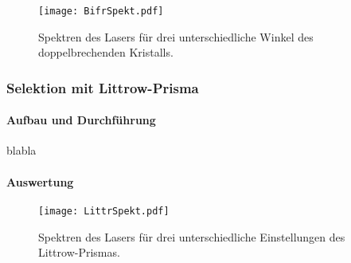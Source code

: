 \begin{figure}[H]
\begin{center}
  \texttt{[image: BifrSpekt.pdf]}
  \caption{Spektren des Lasers für drei unterschiedliche Winkel des doppelbrechenden Kristalls.}
  \label{img:BifrSpekt}
\end{center}
\end{figure}

\subsubsection{Selektion mit Littrow-Prisma}

\paragraph{Aufbau und Durchführung}
blabla


\paragraph{Auswertung}



\begin{figure}[H]
\begin{center}
  \texttt{[image: LittrSpekt.pdf]}
  \caption{Spektren des Lasers für drei unterschiedliche Einstellungen des Littrow-Prismas.}
  \label{img:LittrSpekt}
\end{center}
\end{figure}
